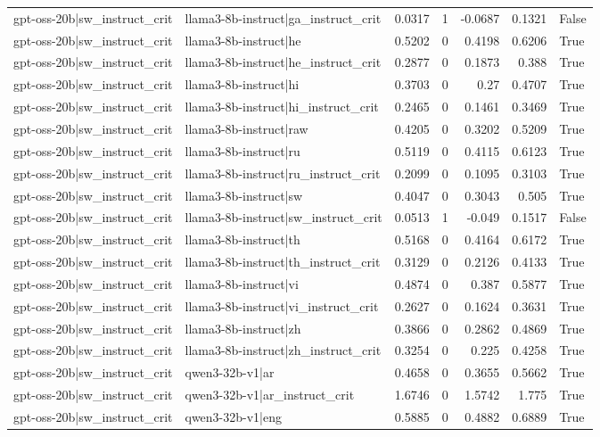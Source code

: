 \begin{table}
\begin{tabular}{l l r r r r l}
gpt-oss-20b|sw_instruct_crit & llama3-8b-instruct|ga_instruct_crit & 0.0317 & 1 & -0.0687 & 0.1321 & False \\
gpt-oss-20b|sw_instruct_crit & llama3-8b-instruct|he & 0.5202 & 0 & 0.4198 & 0.6206 & True \\
gpt-oss-20b|sw_instruct_crit & llama3-8b-instruct|he_instruct_crit & 0.2877 & 0 & 0.1873 & 0.388 & True \\
gpt-oss-20b|sw_instruct_crit & llama3-8b-instruct|hi & 0.3703 & 0 & 0.27 & 0.4707 & True \\
gpt-oss-20b|sw_instruct_crit & llama3-8b-instruct|hi_instruct_crit & 0.2465 & 0 & 0.1461 & 0.3469 & True \\
gpt-oss-20b|sw_instruct_crit & llama3-8b-instruct|raw & 0.4205 & 0 & 0.3202 & 0.5209 & True \\
gpt-oss-20b|sw_instruct_crit & llama3-8b-instruct|ru & 0.5119 & 0 & 0.4115 & 0.6123 & True \\
gpt-oss-20b|sw_instruct_crit & llama3-8b-instruct|ru_instruct_crit & 0.2099 & 0 & 0.1095 & 0.3103 & True \\
gpt-oss-20b|sw_instruct_crit & llama3-8b-instruct|sw & 0.4047 & 0 & 0.3043 & 0.505 & True \\
gpt-oss-20b|sw_instruct_crit & llama3-8b-instruct|sw_instruct_crit & 0.0513 & 1 & -0.049 & 0.1517 & False \\
gpt-oss-20b|sw_instruct_crit & llama3-8b-instruct|th & 0.5168 & 0 & 0.4164 & 0.6172 & True \\
gpt-oss-20b|sw_instruct_crit & llama3-8b-instruct|th_instruct_crit & 0.3129 & 0 & 0.2126 & 0.4133 & True \\
gpt-oss-20b|sw_instruct_crit & llama3-8b-instruct|vi & 0.4874 & 0 & 0.387 & 0.5877 & True \\
gpt-oss-20b|sw_instruct_crit & llama3-8b-instruct|vi_instruct_crit & 0.2627 & 0 & 0.1624 & 0.3631 & True \\
gpt-oss-20b|sw_instruct_crit & llama3-8b-instruct|zh & 0.3866 & 0 & 0.2862 & 0.4869 & True \\
gpt-oss-20b|sw_instruct_crit & llama3-8b-instruct|zh_instruct_crit & 0.3254 & 0 & 0.225 & 0.4258 & True \\
gpt-oss-20b|sw_instruct_crit & qwen3-32b-v1|ar & 0.4658 & 0 & 0.3655 & 0.5662 & True \\
gpt-oss-20b|sw_instruct_crit & qwen3-32b-v1|ar_instruct_crit & 1.6746 & 0 & 1.5742 & 1.775 & True \\
gpt-oss-20b|sw_instruct_crit & qwen3-32b-v1|eng & 0.5885 & 0 & 0.4882 & 0.6889 & True \\

\end{tabular}
\end{table}

